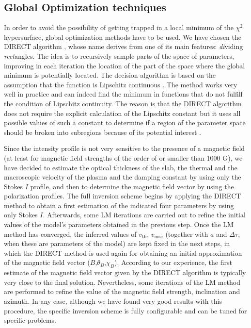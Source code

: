 \documentclass[12pt]{article}
\begin{document}
\subsection{Global Optimization techniques}
In order to avoid the possibility of getting trapped in a local minimum of the
$\chi^2$ hypersurface, global 
optimization methods have to be used. 
We have chosen the DIRECT algorithm 
\citep{Jones_DIRECT93}, whose name derives from one of its main 
features: \emph{di}viding \emph{rect}angles. The idea is to recursively sample 
parts of the space of parameters, improving in each iteration the location of
the part of the space 
where the global minimum is potentially located. The decision algorithm is based
on the assumption that the function is Lipschitz continuous \citep[see][for details]{Jones_DIRECT93}.
The method works very well in practice and can indeed find the minimum in 
functions that do not fulfill the condition of Lipschitz continuity. The reason
is that the DIRECT algorithm does not require the explicit calculation of the 
Lipschitz constant but it uses all possible values of such a constant to determine
if a region of the parameter space should be broken into subregions because of
its potential interest \citep[see][for details]{Jones_DIRECT93}. 

Since the 
intensity profile is not very sensitive to
the presence of a magnetic field (at least for magnetic field 
strengths of the order of or smaller than 1000 G), we have decided to estimate
the optical
thickness of the slab, the thermal and the macroscopic velocity of the
plasma and the damping constant by using only the Stokes $I$ profile, and then to determine the magnetic
field
vector by using the polarization profiles. 
The full inversion scheme
begins by applying the DIRECT method to obtain a first estimation of the
indicated four
parameters by using only Stokes $I$.  Afterwards, 
some LM iterations are carried out to refine the initial values of the  
model's parameters obtained in the previous step. Once the LM method 
has converged, the inferred values of $v_\mathrm{th}$, $v_\mathrm{mac}$ 
(together with $a$ and $\Delta \tau$, when these are parameters of the model)
are kept fixed in the next steps, 
in which the DIRECT method is used again for obtaining an initial approximation
of 
the magnetic field vector 
($B$,$\theta_B$,$\chi_B$). 
According to our experience,
the first estimate of the magnetic field vector given by the DIRECT algorithm 
is typically very close to the final solution. Nevertheless, some iterations of
the LM method are performed to refine the value of the magnetic field strength,
inclination and azimuth.
In any case, although we have found very good results with this procedure, the
specific inversion scheme
is fully configurable and can be tuned for specific problems.
\end{document}

